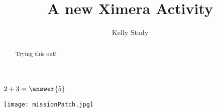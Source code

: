 \documentclass{ximera}
\title{A new Ximera Activity}
\author{Kelly Stady}
\begin{document}
\begin{abstract}
    Trying this out!
\end{abstract}
\maketitle


\begin{exercise}
    $2+3=\answer{5}$
\end{exercise}

\begin{center} %
\texttt{[image: missionPatch.jpg]}
\end{center}
\end{document}

